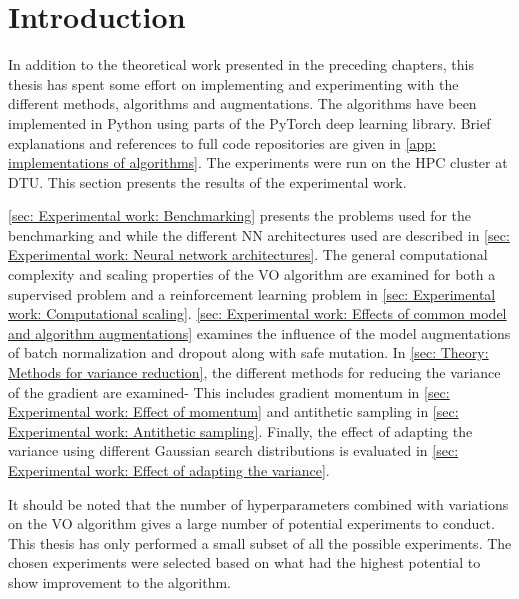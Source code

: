 
\section{Introduction}
In addition to the theoretical work presented in the preceding chapters, this thesis has spent some effort on implementing and experimenting with the different methods, algorithms and augmentations. The algorithms have been implemented in Python using parts of the PyTorch deep learning library.
Brief explanations and references to full code repositories are given in \autoref{app: implementations of algorithms}. The experiments were run on the \gls{HPC} cluster at DTU. This section presents the results of the experimental work. 

\autoref{sec: Experimental work: Benchmarking} presents the problems used for the benchmarking and while the different \gls{NN} architectures used are described in \autoref{sec: Experimental work: Neural network architectures}. 
The general computational complexity and scaling properties of the \gls{VO} algorithm are examined for both a supervised problem and a reinforcement learning problem in \autoref{sec: Experimental work: Computational scaling}.
\autoref{sec: Experimental work: Effects of common model and algorithm augmentations} examines the influence of the model augmentations of batch normalization and dropout along with safe mutation.
In \autoref{sec: Theory: Methods for variance reduction}, the different methods for reducing the variance of the gradient are examined- This includes gradient momentum in \ref{sec: Experimental work: Effect of momentum} and antithetic sampling in \ref{sec: Experimental work: Antithetic sampling}.
Finally, the effect of adapting the variance using different Gaussian search distributions is evaluated in \autoref{sec: Experimental work: Effect of adapting the variance}.

It should be noted that the number of hyperparameters combined with variations on the \gls{VO} algorithm gives a large number of potential experiments to conduct. This thesis has only performed a small subset of all the possible experiments. The chosen experiments were selected based on what had the highest potential to show improvement to the algorithm.
